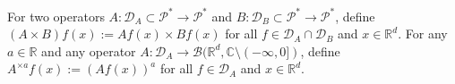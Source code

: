 \documentclass[12pt,a4paper]{amsart}
\theoremstyle{plain}
\newtheorem{lem}[thm]{Lemma}
\theoremstyle{definition}
\numberwithin{equation}{section}
\begin{document}
For two operators $A: \mathcal D_A \subset \mathcal P^*\to \mathcal P^*$ and $B: \mathcal D_B \subset \mathcal P^*\to \mathcal P^*$, define $(A \times B)f (x):= Af(x) \times Bf(x)$ for all $f\in \mathcal D_A \cap \mathcal D_B$ and $x\in \mathbb{R}^d$.
For any $a \in \mathbb R$ and any operator $A :\mathcal D_A \to \mathcal B(\mathbb R^d, \mathbb C\setminus (-\infty, 0])$, define $A^{\times a}f(x):= (Af(x))^a$ for all $f\in \mathcal D_A$ and $x\in \mathbb R^d$.

\begin{comment}
\begin{lem}
  \label{lem: property of controllable operators}
  Suppose that $\Lambda$ is an index set and $(A_\lambda)_{\lambda\in \Lambda}$ is a
  family of operators, from $\mathcal D\subset \mathcal P^*$ to $ \mathcal P^*$,
  which is uniformly 
  $h$-controlled by $R_A$ on $\mathcal D$ for a given function $h:[0,\infty) \to [0, \infty)$.
  Suppose that $\Delta$ is another index set and $(B_\delta)_{\delta\in \Delta}$ is a family of operators, from $\mathcal D_0\subset \mathcal P^*$ to $ \mathcal D$,
  which is uniformly $g$-controlled by $R_B$ on $\mathcal D_0$ 
  for some function $g: [0,\infty) \to [0,\infty)$. 
  Suppose that $(C_\lambda)_{\lambda\in \Lambda} $ is a family of operators, from $\mathcal D\subset \mathcal P^*$ to $ \mathcal P^*$,
  which is uniformly $k$-controlled by $R_C$ on $\mathcal D_0$ for a given function $k:[0,\infty) \to [0, \infty)$.
  Then 
  \begin{itemize}
  \item[(1)]
    $(A_\lambda B_\delta)_{\delta\in \Delta, \lambda \in \Lambda}$ is uniformly $(h \circ g)$-controllable on $\mathcal D_0$;
  \item[(2)]
    $(B_\delta\times A_\lambda)_{\delta \in \Delta, \lambda \in \Lambda}$ is uniformly $(h\times g)$-controllable on $\mathcal D$ and $(B_\delta + A_\lambda)_{\delta \in \Delta, \lambda \in \Lambda}$ is uniformly $(h\vee g)$-controllable on $\mathcal D$;
  \item[(3)] 
    For any $a>0$, $(C^{\times a}_\lambda)_{\lambda \in \Lambda}$ is uniformly $(k^a)$-controllable.
  \item[(4)]
    Suppose further that $(\Lambda, \mathscr F)$ is a measurable space and that $(\lambda,x)\mapsto A_\lambda f(x)$ is $\mathscr F \otimes \mathscr B(\mathbb R^d)$-measurable for each $f\in \mathcal D$.
    For any probability measure $\nu$ on $(\Lambda, \mathscr F)$,  we write
    \[
      A_\nu f(x)
      := \int_{\Lambda} A_\lambda f (x)~\nu(d\lambda),
      \quad f\in \mathcal D, x\in \mathbb R^d.
    \]
    Then  $\{A_\nu: \nu \text{ is  a probability measure on } (\Lambda, \mathscr F)\}$ is uniformly $h$-controllable on $\mathcal D$.
  \end{itemize}
\end{lem}
\end{comment}
\end{document}
